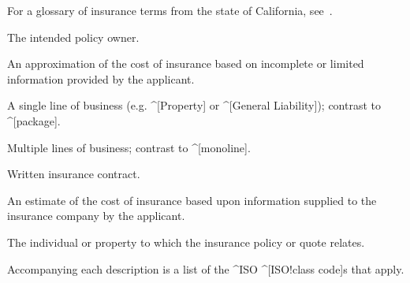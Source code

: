 %
%


For a glossary of insurance terms from the state of California,
see~\cite{gls-ins-calif}.

\begin{description}
  The intended policy owner.

  An approximation of the cost of insurance based on incomplete or limited
  information provided by the applicant.

  A single line of business (e.g. ^[Property] or ^[General Liability]); contrast
  to ^[package].

  Multiple lines of business; contrast to ^[monoline].

  Written insurance contract.

  An estimate of the cost of insurance based upon information supplied to the
  insurance company by the applicant.

  The individual or property to which the insurance policy or quote relates.
\end{description}


Accompanying each description is a list of the ^ISO ^[ISO!class code]s that
apply.

